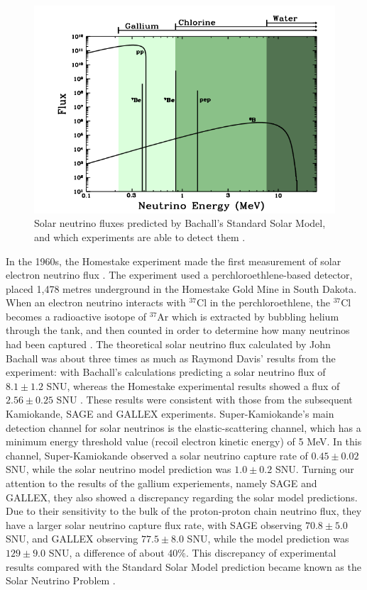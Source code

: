 \begin{figure}
    \centering
    \includegraphics[width=\textwidth]{Figures/nu_energy_bachall.png}
    \caption{Solar neutrino fluxes predicted by Bachall's Standard Solar Model, and which experiments are able to detect them \cite{Bahcall_2003}.}
    \label{fig:nu_energy_bachall}
\end{figure}

In the 1960s, the Homestake experiment made the first measurement of solar electron neutrino flux \cite{homestake_davis}. The experiment used a perchloroethlene-based detector, placed 1,478 metres underground in the Homestake Gold Mine in South Dakota. When an electron neutrino interacts with ${ }^{37} \mathrm{Cl}$ in the perchloroethlene, the ${ }^{37} \mathrm{Cl}$ becomes a radioactive isotope of ${ }^{37} \mathrm{Ar}$ which is extracted by bubbling helium through the tank, and then counted in order to determine how many neutrinos had been captured \cite{davis1994review}. The theoretical solar neutrino flux calculated by John Bachall was about three times as much as Raymond Davis' results from the experiment: with Bachall's calculations predicting a solar neutrino flux of $8.1 \pm 1.2$ SNU, whereas the Homestake experimental results showed a flux of $2.56 \pm 0.25$ SNU \cite{JKonijn1999}. These results were consistent with those from the subsequent Kamiokande, SAGE and GALLEX experiments. Super-Kamiokande's main detection channel for solar neutrinos is the elastic-scattering channel, which has a minimum energy threshold value (recoil electron kinetic energy) of 5 MeV. In this channel, Super-Kamiokande observed a solar neutrino capture rate of $0.45 \pm 0.02$ SNU, while the solar neutrino model prediction was $1.0 \pm 0.2$ SNU. Turning our attention to the results of the gallium experiements, namely SAGE and GALLEX, they also showed a discrepancy regarding the solar model predictions. Due to their sensitivity to the bulk of the proton-proton chain neutrino flux, they have a larger solar neutrino capture flux rate, with SAGE observing $70.8 \pm 5.0$ SNU, and GALLEX observing $77.5 \pm 8.0$ SNU, while the model prediction was $129 \pm 9.0$ SNU, a difference of about 40\%. This discrepancy of experimental results compared with the Standard Solar Model prediction became known as the Solar Neutrino Problem \cite{Haxton_1995}. 

